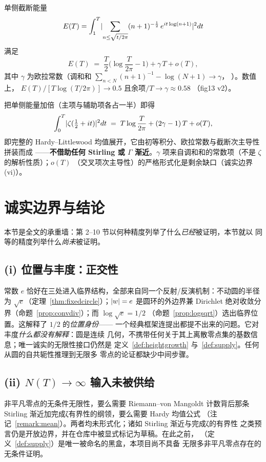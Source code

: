\begin{proposition}\label{prop:meanvalue}
单侧截断能量
\[
  E(T)=\int_1^T \lvert \sum_{n\leq\sqrt{t/2\pi}} (n+1)^{-\frac12}\,e^{it\log(n+1)}\rvert^2 dt
\]
满足
\[
  E(T) \;=\; \frac{T}{2}\Big(\log\frac{T}{2\pi}-1\Big) + \gamma\,T + o(T) ,
\]
其中 $\gamma$ 为欧拉常数（调和和
$\sum_{n< N}(n+1)^{-1}-\log(N+1)\to\gamma$，
）。数值上，
$E(T)/[T\log(T/2\pi)]\to 0.5$ 且余项$/T\to\gamma\approx 0.58$
（fig13 v2）。
\end{proposition}

\begin{remark}\label{remark:hl}
把单侧能量加倍（主项与辅助项各占一半）即得
\[
  \int_0^T \lvert \zeta(\tfrac12+it)\rvert^2 dt \;=\; T\log\frac{T}{2\pi} + (2\gamma-1)\,T + o(T) ,
\]
即完整的 Hardy--Littlewood 均值展开，它由初等积分、欧拉常数与截断次主导性拼装而成
——\textbf{不借助任何 Stirling 或 $\Gamma$ 渐近}。$\gamma$
项来自调和和的常数项（不是 $\zeta$ 的解析性质）；$o(T)$
（交叉项次主导性）的严格形式化是剩余缺口（诚实边界 (vi)）。
\end{remark}

\section{诚实边界与结论}\label{sec:honesty}

本节是全文的承重墙：第 2--10 节以何种精度列举了什么\emph{已经}被证明，本节就以
同等的精度列举什么\emph{尚未}被证明。

\subsection*{(i) 位置与丰度：正交性}
常数 $e$ 恰好在三处进入临界结构，全部来自同一个反射/反演机制：不动圆的半径为
$\sqrt{e}$（定理~\ref{thm:fixedcircle}）；$\lvert w\rvert=e$ 是圆环的外边界兼 Dirichlet
绝对收敛分界（命题~\ref{prop:convdiv}）；而 $\log\sqrt{e}=1/2$
（命题~\ref{prop:logsqrt}）选出临界位置。这解释了 $1/2$ 的\emph{位置身份}——
一个经典框架连提出都提不出来的问题。它对丰度\emph{什么都没有解释}：圆是连续
几何，不携带任何关于其上离散零点集的基数信息；唯一诚实的无限性接口仍然是
定义~\ref{def:heightgrowth} 与~\ref{def:supply}。任何从圆的自共轭性推理到无限多
零点的论证都缺少中间步骤。

\subsection*{(ii) $N(T)\to\infty$ 输入未被供给}
非平凡零点的无条件无限性，要么需要 Riemann--von Mangoldt
计数背后那条 Stirling 渐近加完成ζ有界性的纲领，要么需要 Hardy 均值公式
（注记~\ref{remark:mean}）。两者均未形式化；诸如 Stirling 渐近与完成ζ的有界性
之类预言仍是开放边界，并在仓库中被显式标记为草稿。在此之前，
（定义~\ref{def:supply}）是唯一被命名的黑盒，本项目尚不具备
无限多非平凡零点存在的无条件证明。

